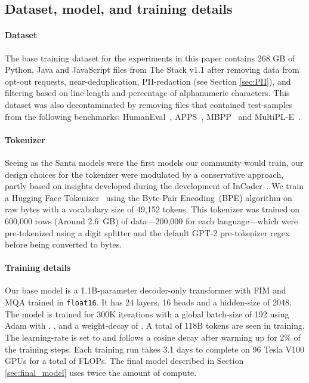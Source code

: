 \documentclass[10pt]{article} \usepackage{iclr2023_conference,times}
\begin{document}
\subsection{Dataset, model, and training details}\label{sec:dataset_model}
\paragraph{Dataset} The base training dataset for the experiments in this paper contains 268 GB of Python, Java and JavaScript files from The Stack v1.1 \citep{Kocetkov2022TheStack} after removing data from opt-out requests, near-deduplication, PII-redaction (see Section \ref{sec:PII}), and filtering based on line-length and percentage of alphanumeric characters. This dataset was also decontaminated by removing files that contained test-samples from the following benchmarks: HumanEval~\citep{chen2021codex}, APPS~\citep{hendrycks2021measuring}, MBPP~\citep{austin2021program} and MultiPL-E~\citep{cassano2022multiple}.


\paragraph{Tokenizer}
Seeing as the Santa models were the first models our community would train, our design choices for the tokenizer were modulated by a conservative approach, partly based on insights developed during the development of InCoder~\citep{fried2022incoder}. We train a Hugging Face Tokenizer~\citep{anthony_moi_2022_hftokenizers} using the Byte-Pair Encoding~(BPE) algorithm on raw bytes with a vocabulary size of 49,152 tokens. This tokenizer was trained on 600,000 rows (Around 2.6 GB) of data---200,000 for each language---which were pre-tokenized using a digit splitter and the default GPT-2 pre-tokenizer regex before being converted to bytes.



\paragraph{Training details} Our base model is a 1.1B-parameter decoder-only transformer with FIM and MQA trained in \texttt{float16}. It has 24 layers, 16 heads and a hidden-size of 2048. The model is trained for 300K iterations with a global batch-size of 192 using Adam \citep{DBLP:journals/corr/KingmaB14} with , ,  and a weight-decay of . A total of 118B tokens are seen in training. The learning-rate is set to  and follows a cosine decay after warming up for 2\% of the training steps.
Each training run takes 3.1 days to complete on 96 Tesla V100 GPUs for a total of  FLOPs.
The final model described in Section \ref{sec:final_model} uses twice the amount of compute.
\end{document}
